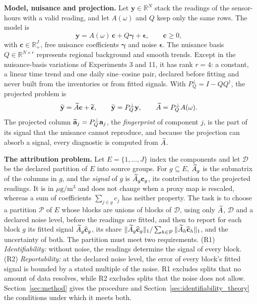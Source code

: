 \noindent\textbf{Model, nuisance and projection.}
Let \(\mathbf y\in\mathbb R^N\) stack the readings of the sensor-hours with a valid
reading, and let \(A(\omega)\) and \(Q\) keep only the same rows.  The model is
\begin{equation}
\mathbf y = A(\omega)\,\mathbf c + Q\boldsymbol\gamma + \boldsymbol\epsilon,
\qquad \mathbf c\ge 0,
\label{eq:general_model}
\end{equation}
with \(\mathbf c\in\mathbb R_+^J\), free nuisance coefficients \(\boldsymbol\gamma\) and
noise \(\boldsymbol\epsilon\).  The nuisance basis \(Q\in\mathbb R^{N\times r}\) represents
regional background and smooth trends.  Except in the nuisance-basis variations of Experiments 3 and 11, it
has rank \(r=4\): a constant, a linear time trend and one daily sine--cosine pair,
declared before fitting and never built from the inventories or from fitted
signals.  With
\(P_Q^\perp=I-QQ^\dagger\), the projected problem is
\begin{equation}
\widetilde{\mathbf y}=\widetilde A\mathbf c+\widetilde{\boldsymbol\epsilon},\qquad
\widetilde{\mathbf y}=P_Q^\perp\mathbf y,\qquad
\widetilde A=P_Q^\perp A(\omega).
\label{eq:projected_model}
\end{equation}
The projected column \(\widetilde{\mathbf a}_j=P_Q^\perp\mathbf a_j\), the \emph{fingerprint} of component
\(j\), is the part of its signal that the nuisance cannot reproduce, and because the
projection can absorb a signal, every diagnostic is computed from \(\widetilde A\).

\noindent\textbf{The attribution problem.}
Let \(E=\{1,\dots,J\}\) index the components and let \(\mathcal D\) be the declared
partition of \(E\) into source groups.  For \(g\subseteq E\), \(\widetilde A_g\) is the submatrix
of the columns in \(g\), and the \emph{signal} of \(g\) is \(\widetilde A_g\mathbf c_g\), its
contribution to the projected readings.  It is in \(\mu\mathrm g/\mathrm m^3\) and does
not change when a proxy map is rescaled, whereas a sum of coefficients \(\sum_{j\in g}c_j\) has
neither property.  The task is to choose a partition \(\mathcal P\) of \(E\) whose blocks
are unions of blocks of \(\mathcal D\), using only \(\widetilde A\), \(\mathcal D\) and a declared
noise level, before the readings are fitted, and then to report for each block \(g\) its
fitted signal \(\widetilde A_g\widehat{\mathbf c}_g\), its share
\(\|\widetilde A_g\widehat{\mathbf c}_g\|_1/\sum_{h\in\mathcal P}\|\widetilde A_h\widehat{\mathbf c}_h\|_1\), and
the uncertainty of both.  The partition must meet two requirements.  (R1) \emph{Identifiability:} without
noise, the readings determine the signal of every block.  (R2) \emph{Reportability:} at
the declared noise level, the error of every block's fitted signal is bounded by a
stated multiple of the noise.  R1 excludes splits that no amount of data resolves, while R2 excludes splits that the
noise does not allow.  Section~\ref{sec:method} gives the procedure and
Section~\ref{sec:identifiability_theory} the conditions under which it meets both.
